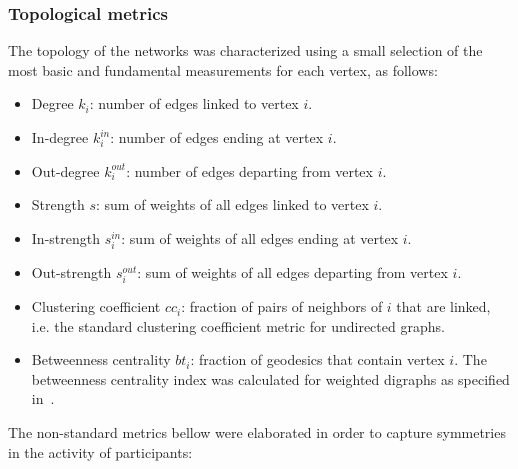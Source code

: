 \documentclass[%
	aip,
	jmp,%
	amsmath,amssymb,
	reprint,%
]{revtex4-1}
\begin{document}

\subsubsection{Topological metrics}\label{measures}

The topology of the networks was characterized 
using a small selection of the most basic and 
fundamental measurements for each vertex, as follows:

\begin{itemize}
	\item Degree     $k_i$: number of edges linked to vertex $i$.
	\item In-degree  $k_i^{in}$: number of edges ending at vertex $i$.
	\item Out-degree $k_i^{out}$: number of edges departing from vertex $i$.
	\item Strength $s$: sum of weights of all edges linked to vertex $i$.
	\item In-strength $s_i^{in}$: sum of weights of all edges ending at vertex $i$.
	\item Out-strength $s_i^{out}$: sum of weights of all edges departing from vertex $i$.
	\item Clustering coefficient $cc_i$: fraction of pairs of neighbors of $i$ that are linked, i.e. the standard clustering coefficient metric for undirected graphs.
	\item Betweenness centrality $bt_i$: fraction of geodesics that contain vertex $i$. The betweenness centrality index was calculated for weighted digraphs as specified in~\cite{faster}.
\end{itemize}

The non-standard metrics bellow were elaborated
in order to capture symmetries in the activity of participants:
\end{document}
